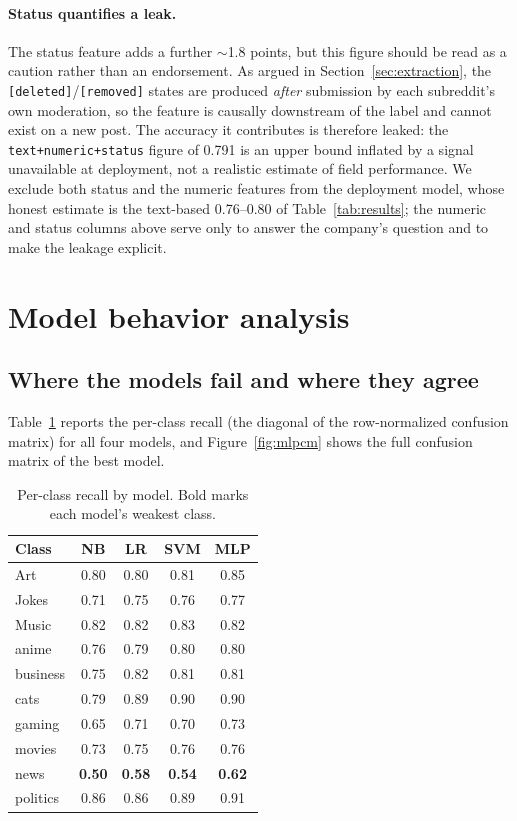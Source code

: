 \documentclass[11pt,a4paper]{article}
\begin{document}
\paragraph{Status quantifies a leak.}
The status feature adds a further $\sim$1.8 points, but this figure should be
read as a caution rather than an endorsement. As argued in
Section~\ref{sec:extraction}, the \texttt{[deleted]}/\texttt{[removed]} states
are produced \emph{after} submission by each subreddit's own moderation, so
the feature is causally downstream of the label and cannot exist on a new
post. The accuracy it contributes is therefore leaked: the
\texttt{text+numeric+status} figure of 0.791 is an upper bound inflated by a
signal unavailable at deployment, not a realistic estimate of field
performance. We exclude both status and the numeric features from the
deployment model, whose honest estimate is the text-based 0.76--0.80 of
Table~\ref{tab:results}; the numeric and status columns above serve only to
answer the company's question and to make the leakage explicit.

\section{Model behavior analysis}
\label{sec:behavior}
 
\subsection{Where the models fail and where they agree}
Table~\ref{tab:recall} reports the per-class recall (the diagonal of the
row-normalized confusion matrix) for all four models, and
Figure~\ref{fig:mlpcm} shows the full confusion matrix of the best model.
 
\begin{table}[htbp]\centering\small
\caption{Per-class recall by model. Bold marks each model's weakest class.}
\label{tab:recall}
\begin{tabular}{lcccc}\toprule
Class & NB & LR & SVM & MLP\\\midrule
Art      & 0.80 & 0.80 & 0.81 & 0.85\\
Jokes    & 0.71 & 0.75 & 0.76 & 0.77\\
Music    & 0.82 & 0.82 & 0.83 & 0.82\\
anime    & 0.76 & 0.79 & 0.80 & 0.80\\
business & 0.75 & 0.82 & 0.81 & 0.81\\
cats     & 0.79 & 0.89 & 0.90 & 0.90\\
gaming   & 0.65 & 0.71 & 0.70 & 0.73\\
movies   & 0.73 & 0.75 & 0.76 & 0.76\\
news     & \textbf{0.50} & \textbf{0.58} & \textbf{0.54} & \textbf{0.62}\\
politics & 0.86 & 0.86 & 0.89 & 0.91\\\bottomrule
\end{tabular}
\end{table}
 
\end{document}

